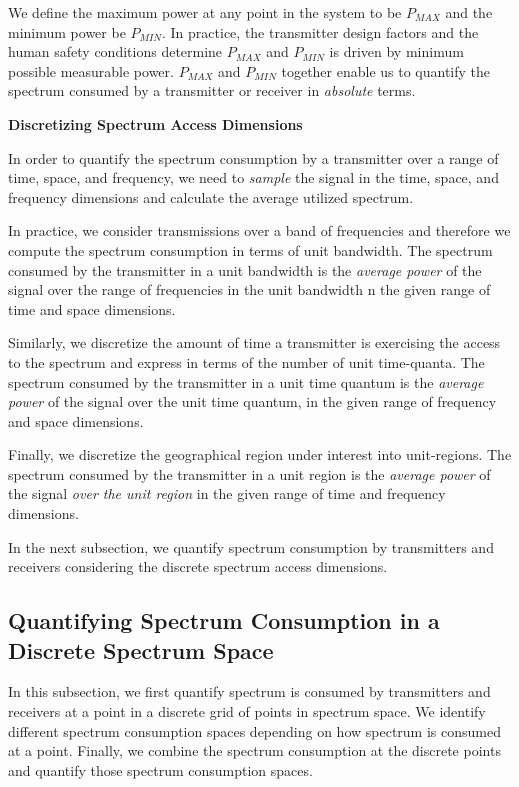 \documentclass[journal,12pt,draftclsnofoot,onecolumn]{IEEEtran}
\begin{document}
We define the maximum power at any point in the system to be $P_{MAX}$ and the minimum power be $P_{MIN}$. In practice, the transmitter design factors and the human safety conditions determine $P_{MAX}$ and $P_{MIN}$ is driven by minimum possible measurable power. $P_{MAX}$ and $P_{MIN}$ together enable us to quantify the spectrum consumed by a transmitter or receiver in \textit{absolute} terms.

\noindent
\textbf{Discretizing Spectrum Access Dimensions}

In order to quantify the spectrum consumption by a transmitter over a range of time, space, and frequency, we need to \textit{sample} the signal in the time, space, and frequency dimensions and calculate the average utilized spectrum.

In practice, we consider transmissions over a band of frequencies and therefore we compute the spectrum consumption in terms of unit bandwidth. The spectrum consumed by the transmitter in a unit bandwidth is the \textit{average power} of the signal over the range of frequencies in the unit bandwidth n the given range of time and space dimensions.

Similarly, we discretize the amount of time a transmitter is exercising the access to the spectrum and express in terms of the number of unit time-quanta.
The spectrum consumed by the transmitter in a unit time quantum is the \textit{average power} of the signal over the unit time quantum, in the given range of frequency and space dimensions. 

Finally, we discretize the geographical region under interest into unit-regions. The spectrum consumed by the transmitter in a unit region is the \textit{average power }of the signal \textit{over the unit region} in the given range of time and frequency dimensions.

In the next subsection, we quantify spectrum consumption by transmitters and receivers considering the discrete spectrum access dimensions. 
\subsection{Quantifying Spectrum Consumption in a Discrete Spectrum Space}

In this subsection, we first quantify spectrum is consumed by transmitters and receivers at a point in a discrete grid of points in spectrum space. We identify different spectrum consumption spaces depending on how spectrum is consumed at a point. Finally, we combine the spectrum consumption at the discrete points and quantify those spectrum consumption spaces.
\end{document}
